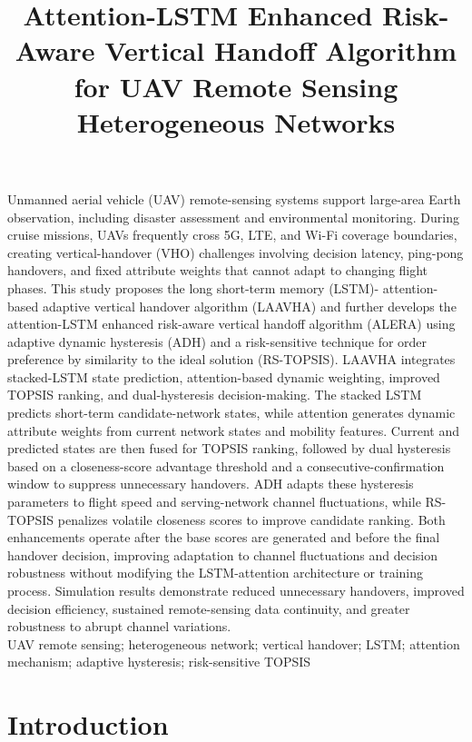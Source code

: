 \documentclass[10pt,a4paper]{article}
\title{Attention-LSTM Enhanced Risk-Aware Vertical Handoff Algorithm for UAV Remote Sensing Heterogeneous Networks}
\date{}
\begin{document}
\pagestyle{plain}
\fontsize{10.5pt}{15.75pt}\selectfont
\maketitle
\thispagestyle{plain}

Unmanned aerial vehicle (UAV) remote-sensing systems support large-area Earth observation, including disaster assessment and environmental monitoring. During cruise missions, UAVs frequently cross 5G, LTE, and Wi-Fi coverage boundaries, creating vertical-handover (VHO) challenges involving decision latency, ping-pong handovers, and fixed attribute weights that cannot adapt to changing flight phases. This study proposes the long short-term memory (LSTM)- attention-based adaptive vertical handover algorithm (LAAVHA) and further develops the attention-LSTM enhanced risk-aware vertical handoff algorithm (ALERA) using adaptive dynamic hysteresis (ADH) and a risk-sensitive technique for order preference by similarity to the ideal solution (RS-TOPSIS). LAAVHA integrates stacked-LSTM state prediction, attention-based dynamic weighting, improved TOPSIS ranking, and dual-hysteresis decision-making. The stacked LSTM predicts short-term candidate-network states, while attention generates dynamic attribute weights from current network states and mobility features. Current and predicted states are then fused for TOPSIS ranking, followed by dual hysteresis based on a closeness-score advantage threshold and a consecutive-confirmation window to suppress unnecessary handovers. ADH adapts these hysteresis parameters to flight speed and serving-network channel fluctuations, while RS-TOPSIS penalizes volatile closeness scores to improve candidate ranking. Both enhancements operate after the base scores are generated and before the final handover decision, improving adaptation to channel fluctuations and decision robustness without modifying the LSTM-attention architecture or training process. Simulation results demonstrate reduced unnecessary handovers, improved decision efficiency, sustained remote-sensing data continuity, and greater robustness to abrupt channel variations.\\[2mm]
 UAV remote sensing; heterogeneous network; vertical handover; LSTM; attention mechanism; adaptive hysteresis; risk-sensitive TOPSIS

\setcounter{section}{-1}
\section{Introduction}
\end{document}
